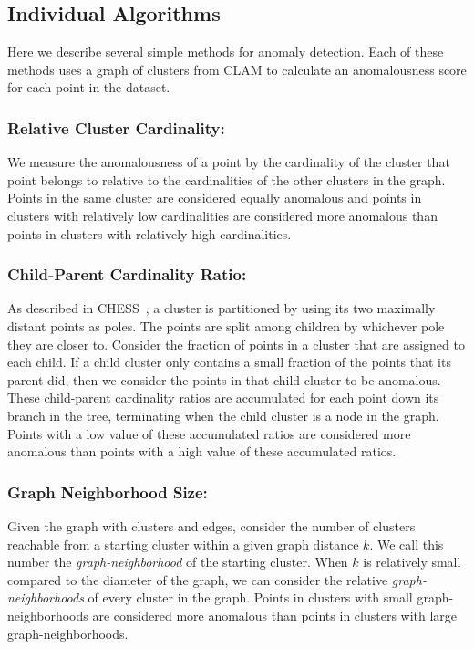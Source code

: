 \subsection{Individual Algorithms}\label{subsec:methods:individual-algorithms}

Here we describe several simple methods for anomaly detection.
Each of these methods uses a graph of clusters from CLAM to calculate an anomalousness score for each point in the dataset.

\subsubsection{Relative Cluster Cardinality:}
We measure the anomalousness of a point by the cardinality of the cluster that point belongs to relative to the cardinalities of the other clusters in the graph.
Points in the same cluster are considered equally anomalous and points in clusters with relatively low cardinalities are considered more anomalous than points in clusters with relatively high cardinalities.

\subsubsection{Child-Parent Cardinality Ratio:}
As described in CHESS~\cite{ishaq2019clustered}, a cluster is partitioned by using its two maximally distant points as poles.
The points are split among children by whichever pole they are closer to.
Consider the fraction of points in a cluster that are assigned to each child.
If a child cluster only contains a small fraction of the points that its parent did, then we consider the points in that child cluster to be anomalous.
These child-parent cardinality ratios are accumulated for each point down its branch in the tree, terminating when the child cluster is a node in the graph.
Points with a low value of these accumulated ratios are considered more anomalous than points with a high value of these accumulated ratios.

\subsubsection{Graph Neighborhood Size:}
Given the graph with clusters and edges, consider the number of clusters reachable from a starting cluster within a given graph distance $k$.
We call this number the \textit{graph-neighborhood} of the starting cluster.
When $k$ is relatively small compared to the diameter of the graph, we can consider the relative \textit{graph-neighborhoods} of every cluster in the graph.
Points in clusters with small graph-neighborhoods are considered more anomalous than points in clusters with large graph-neighborhoods.

